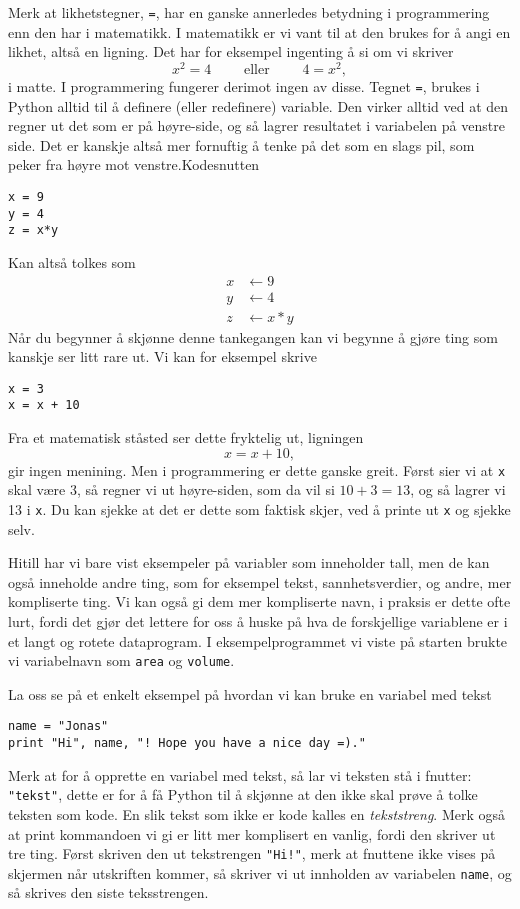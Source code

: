 \documentclass[a4paper, 11pt, notitlepage]{article}
\begin{document}
Merk at likhetstegner, \verb+=+, har en ganske annerledes betydning i programmering enn den har i matematikk. I matematikk er vi vant til at den brukes for å angi en likhet, altså en ligning. Det har for eksempel ingenting å si om vi skriver
$$x^2 = 4 \qquad \mbox{ eller } \qquad 4 = x^2,$$ 
i matte. I programmering fungerer derimot ingen av disse. Tegnet \verb+=+, brukes i Python alltid til å definere (eller redefinere) variable. Den virker alltid ved at den regner ut det som er på høyre-side, og så lagrer resultatet i variabelen på venstre side. Det er kanskje altså mer fornuftig å tenke på det som en slags pil, som peker fra høyre mot venstre.Kodesnutten
\begin{lstlisting}
x = 9
y = 4
z = x*y
\end{lstlisting}
\vspace{-0.3cm}
Kan altså tolkes som
\begin{align*}
x &\leftarrow 9 \\
y &\leftarrow 4 \\
z &\leftarrow x*y
\end{align*}
Når du begynner å skjønne denne tankegangen kan vi begynne å gjøre ting som kanskje ser litt rare ut. Vi kan for eksempel skrive
\begin{lstlisting}
x = 3
x = x + 10
\end{lstlisting}
\vspace{-0.3cm}
Fra et matematisk ståsted ser dette fryktelig ut, ligningen
$$x = x+10,$$
gir ingen menining. Men i programmering er dette ganske greit. Først sier vi at \verb+x+ skal være 3, så regner vi ut høyre-siden, som da vil si $10+3 = 13$, og så lagrer vi 13 i \verb+x+. Du kan sjekke at det er dette som faktisk skjer, ved å printe ut \verb+x+ og sjekke selv.

Hitill har vi bare vist eksempeler på variabler som inneholder tall, men de kan også inneholde andre ting, som for eksempel tekst, sannhetsverdier, og andre, mer kompliserte ting. Vi kan også gi dem mer kompliserte navn, i praksis er dette ofte lurt, fordi det gjør det lettere for oss å huske på hva de forskjellige variablene er i et langt og rotete dataprogram. I eksempelprogrammet vi viste på starten brukte vi variabelnavn som \verb+area+ og \verb+volume+.

La oss se på et enkelt eksempel på hvordan vi kan bruke en variabel med tekst
\begin{lstlisting}
name = "Jonas"
print "Hi", name, "! Hope you have a nice day =)."
\end{lstlisting}
\vspace{-0.3cm}
Merk at for å opprette en variabel med tekst, så lar vi teksten stå i fnutter: \verb+"tekst"+, dette er for å få Python til å skjønne at den ikke skal prøve å tolke teksten som kode. En slik tekst som ikke er kode kalles en \emph{tekststreng}. Merk også at print kommandoen vi gi er litt mer komplisert en vanlig, fordi den skriver ut tre ting. Først skriven den ut tekstrengen \verb+"Hi!"+, merk at fnuttene ikke vises på skjermen når utskriften kommer, så skriver vi ut innholden av variabelen \verb+name+, og så skrives den siste teksstrengen.
\end{document}
